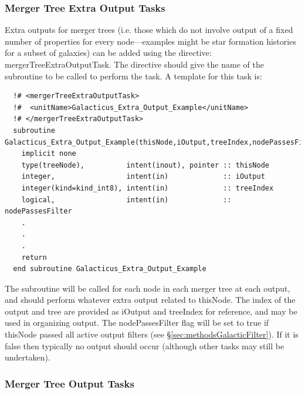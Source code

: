 \subsubsection{Merger Tree Extra Output Tasks}

Extra outputs for merger trees (i.e. those which do not involve output of a fixed number of properties for every node---examples might be star formation histories for a subset of galaxies) can be added using the directive: {\normalfont \ttfamily mergerTreeExtraOutputTask}. The directive should give the name of the subroutine to be called to perform the task. A template for this task is:
\begin{verbatim}
  !# <mergerTreeExtraOutputTask>
  !#  <unitName>Galacticus_Extra_Output_Example</unitName>
  !# </mergerTreeExtraOutputTask>
  subroutine Galacticus_Extra_Output_Example(thisNode,iOutput,treeIndex,nodePassesFilter)
    implicit none
    type(treeNode),          intent(inout), pointer :: thisNode
    integer,                 intent(in)             :: iOutput
    integer(kind=kind_int8), intent(in)             :: treeIndex
    logical,                 intent(in)             :: nodePassesFilter
    .
    .
    .
    return
  end subroutine Galacticus_Extra_Output_Example
\end{verbatim}
The subroutine will be called for each node in each merger tree at each output, and should perform whatever extra output related to {\normalfont \ttfamily thisNode}. The index of the output and tree are provided as {\normalfont \ttfamily iOutput} and {\normalfont \ttfamily treeIndex} for reference, and may be used in organizing output. The {\normalfont \ttfamily nodePassesFilter} flag will be set to {\normalfont \ttfamily true} if {\normalfont \ttfamily thisNode} passed all active output filters (see \S\ref{sec:methodsGalacticFilter}). If it is {\normalfont \ttfamily false} then typically no output should occur (although other tasks may still be undertaken).

\subsubsection{Merger Tree Output Tasks}

